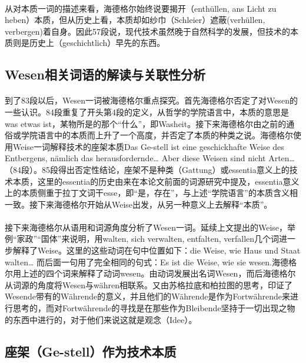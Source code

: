 \documentclass{article}
\begin{document}
		\paragraph{}
		从对本质一词的描述来看，海德格尔始终说要揭开（enthüllen, ans Licht zu heben）本质，但从历史上看，本质却如纱巾（Schleier）遮蔽(verhüllen, verbergen)着自身。因此57段说，现代技术虽然晚于自然科学的发展，但技术的本质则是历史上（geschichtlich）早先的东西。
		\paragraph{}
		
	\subsection{Wesen相关词语的解读与关联性分析}
		\paragraph{}
		到了83段以后，Wesen一词被海德格尔重点探究。首先海德格尔否定了对Wesen的一些认识。84段重复了开头第4段的定义，从哲学的学院语言中，本质的意思是was etwas ist，某物所是的那个“什么”，即Washeit。接下来海德格尔由之前的通俗或学院语言中的本质而上升了一个高度，并否定了本质的种类之说。海德格尔使用Weise一词解释技术的座架本质Das Ge-stell ist eine geschickhafte Weise des Entbergens, nämlich das herausfordernde… Aber diese Weisen sind nicht Arten… （84段）。85段得出否定性结论，座架不是种类（Gattung）或essentia意义上的技术本质，这里的essentia的历史由来在本论文前面的词源研究中提及，essentia意义上的本质侧重于拉丁文词干esse，即“是，存在”，与上述“学院语言”的本质含义相一致。接下来海德格尔开始从Weise出发，从另一种意义上去解释“本质”。
		\paragraph{}
		接下来海德格尔从语用和词源角度分析了Wesen一词。延续上文提出的Weise，举例“家政”“国体”来说明，用walten, sich verwalten, entfalten, verfallen几个词进一步解释了Weise。这里的这些动词在句中位置如下：die Weise, wie Haus und Staat walten… 而后面一句用了完全相同的句式：Es ist die Weise, wie sie wesen.海德格尔用上述的四个词来解释了动词wesen。由动词发展出名词Wesen，而后海德格尔从词源的角度将Wesen与währen相联系。又由苏格拉底和柏拉图的思考，印证了Wesende带有的Währende的意义，并且他们的Währende是作为Fortwährende来进行思考的，而对Fortwährende的寻找是在那些作为Bleibende坚持于一切出现之物的东西中进行的，对于他们来说这就是观念（Idee）。
	\subsection{座架（Ge-stell）作为技术本质}
\end{document}
